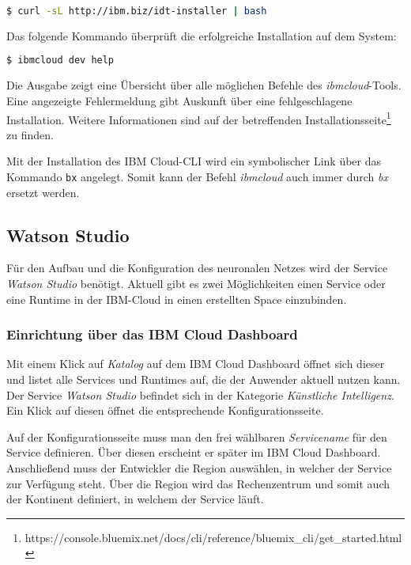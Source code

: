 \begin{lstlisting}[language=bash, caption=Installation des IBM Cloud CLI, label=ls:vorbereitung_ibmcli]
    $ curl -sL http://ibm.biz/idt-installer | bash
\end{lstlisting}

Das folgende Kommando überprüft die erfolgreiche Installation auf dem System:

\begin{lstlisting}[language=bash, caption=Installation des CLI überprüfen, label=ls:vorbereitung_ibmclitest]
    $ ibmcloud dev help
\end{lstlisting}

Die Ausgabe zeigt eine Übersicht über alle möglichen Befehle des \textit{ibmcloud}-Tools. Eine angezeigte Fehlermeldung
gibt Auskunft über eine fehlgeschlagene Installation. Weitere Informationen sind auf der betreffenden
Installationsseite\footnote{https://console.bluemix.net/docs/cli/reference/bluemix\_cli/get\_started.html} zu finden.

Mit der Installation des IBM Cloud-CLI wird ein symbolischer Link über das Kommando \texttt{bx} angelegt. Somit kann der
Befehl \textit{ibmcloud} auch immer durch \textit{bx} ersetzt werden.

\subsection{Watson Studio}
Für den Aufbau und die Konfiguration des neuronalen Netzes wird der Service \textit{Watson Studio} benötigt. Aktuell gibt
es zwei Möglichkeiten einen Service oder eine Runtime in der IBM-Cloud in einen erstellten Space einzubinden.

\subsubsection{Einrichtung über das IBM Cloud Dashboard}
Mit einem Klick auf \textit{Katalog} auf dem IBM Cloud Dashboard öffnet sich dieser und listet alle Services und Runtimes
auf, die der Anwender aktuell nutzen kann. Der Service \textit{Watson Studio} befindet sich in der Kategorie
\textit{Künstliche Intelligenz}. Ein Klick auf diesen öffnet die entsprechende Konfigurationsseite.

Auf der Konfigurationsseite muss man den frei wählbaren \textit{Servicename} für den Service definieren. Über diesen
erscheint er später im IBM Cloud Dashboard. Anschließend muss der Entwickler die Region auswählen, in welcher der Service
zur Verfügung steht. Über die Region wird das Rechenzentrum und somit auch der Kontinent definiert, in welchem der Service
läuft.

